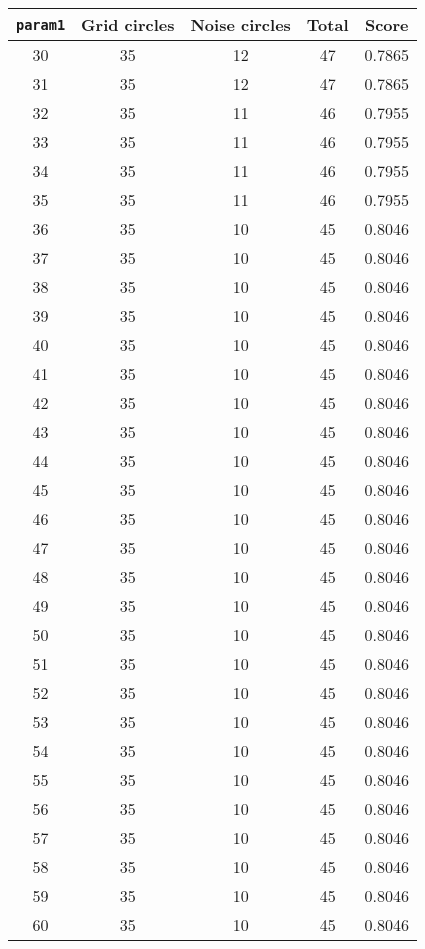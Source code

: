 \documentclass[letterpaper, 12pt]{article}
\begin{document}
\begin{longtable}{|c|c|c|c|c|}
\hline
\textbf{\texttt{param1}} & \textbf{Grid circles} & \textbf{Noise circles} & \textbf{Total} & \textbf{Score} \\
\hline
30 & 35 & 12 & 47 & 0.7865 \\
\hline
31 & 35 & 12 & 47 & 0.7865 \\
\hline
32 & 35 & 11 & 46 & 0.7955 \\
\hline
33 & 35 & 11 & 46 & 0.7955 \\
\hline
34 & 35 & 11 & 46 & 0.7955 \\
\hline
35 & 35 & 11 & 46 & 0.7955 \\
\hline
36 & 35 & 10 & 45 & 0.8046 \\
\hline
37 & 35 & 10 & 45 & 0.8046 \\
\hline
38 & 35 & 10 & 45 & 0.8046 \\
\hline
39 & 35 & 10 & 45 & 0.8046 \\
\hline
40 & 35 & 10 & 45 & 0.8046 \\
\hline
41 & 35 & 10 & 45 & 0.8046 \\
\hline
42 & 35 & 10 & 45 & 0.8046 \\
\hline
43 & 35 & 10 & 45 & 0.8046 \\
\hline
44 & 35 & 10 & 45 & 0.8046 \\
\hline
45 & 35 & 10 & 45 & 0.8046 \\
\hline
46 & 35 & 10 & 45 & 0.8046 \\
\hline
47 & 35 & 10 & 45 & 0.8046 \\
\hline
48 & 35 & 10 & 45 & 0.8046 \\
\hline
49 & 35 & 10 & 45 & 0.8046 \\
\hline
50 & 35 & 10 & 45 & 0.8046 \\
\hline
51 & 35 & 10 & 45 & 0.8046 \\
\hline
52 & 35 & 10 & 45 & 0.8046 \\
\hline
53 & 35 & 10 & 45 & 0.8046 \\
\hline
54 & 35 & 10 & 45 & 0.8046 \\
\hline
55 & 35 & 10 & 45 & 0.8046 \\
\hline
56 & 35 & 10 & 45 & 0.8046 \\
\hline
57 & 35 & 10 & 45 & 0.8046 \\
\hline
58 & 35 & 10 & 45 & 0.8046 \\
\hline
59 & 35 & 10 & 45 & 0.8046 \\
\hline
60 & 35 & 10 & 45 & 0.8046 \\

\end{longtable}
\end{document}
